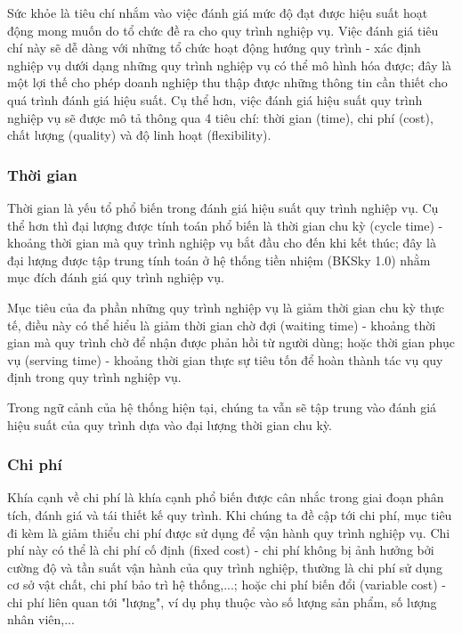 Sức khỏe là tiêu chí nhắm vào việc đánh giá mức độ đạt được hiệu suất hoạt động mong muốn do tổ chức đề ra cho quy trình nghiệp vụ. Việc đánh giá tiêu chí này sẽ dễ dàng với những tổ chức hoạt động hướng quy trình - xác định nghiệp vụ dưới dạng những quy trình nghiệp vụ có thể mô hình hóa được; đây là một lợi thế cho phép doanh nghiệp thu thập được những thông tin cần thiết cho quá trình đánh giá hiệu suất. Cụ thể hơn, việc đánh giá hiệu suất quy trình nghiệp vụ sẽ được mô tả thông qua 4 tiêu chí: thời gian (time), chi phí (cost), chất lượng (quality) và độ linh hoạt (flexibility).
    \subsubsection{Thời gian}
    
    Thời gian là yếu tổ phổ biến trong đánh giá hiệu suất quy trình nghiệp vụ. Cụ thể hơn thì đại lượng được tính toán phổ biến là thời gian chu kỳ (cycle time) - khoảng thời gian mà quy trình nghiệp vụ bắt đầu cho đến khi kết thúc; đây là đại lượng được tập trung tính toán ở hệ thống tiền nhiệm (BKSky 1.0) nhằm mục đích đánh giá quy trình nghiệp vụ. 
    
    Mục tiêu của đa phần những quy trình nghiệp vụ là giảm thời gian chu kỳ thực tế, điều này có thể hiểu là giảm thời gian chờ đợi (waiting time) - khoảng thời gian mà quy trình chờ để nhận được phản hồi từ người dùng; hoặc thời gian phục vụ (serving time) - khoảng thời gian thực sự tiêu tốn để hoàn thành tác vụ quy định trong quy trình nghiệp vụ.

    Trong ngữ cảnh của hệ thống hiện tại, chúng ta vẫn sẽ tập trung vào đánh giá hiệu suất của quy trình dựa vào đại lượng thời gian chu kỳ.
    \subsubsection{Chi phí}

    Khía cạnh về chi phí là khía cạnh phổ biến được cân nhắc trong giai đoạn phân tích, đánh giá và tái thiết kế quy trình. Khi chúng ta đề cập tới chi phí, mục tiêu đi kèm là giảm thiểu chi phí được sử dụng để vận hành quy trình nghiệp vụ. Chi phí này có thể là chi phí cố định (fixed cost) - chi phí không bị ảnh hưởng bởi cường độ và tần suất vận hành của quy trình nghiệp, thường là chi phí sử dụng cơ sở vật chất, chi phí bảo trì hệ thống,...; hoặc chi phí biến đổi (variable cost) - chi phí liên quan tới "lượng", ví dụ phụ thuộc vào số lượng sản phẩm, số lượng nhân viên,...
    
